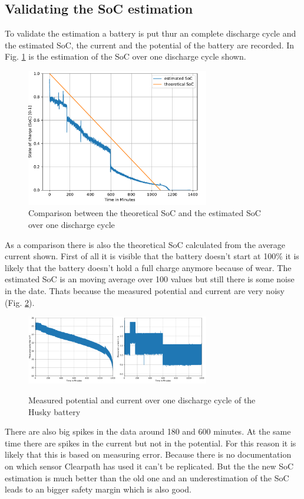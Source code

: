 \documentclass[conference]{IEEEtran}
\begin{document}
\subsection{Validating the SoC estimation}
To validate the estimation a battery is put thur an complete discharge cycle and the estimated SoC, the current and the potential of the battery are recorded.
In Fig. \ref{fig:SoCUeberZeit} is the estimation of the SoC over one discharge cycle shown.
\begin{figure}[htbp]
    \centerline{\includegraphics[width=8cm]{Pictures/SoCUeberZeit.pdf}}
    \caption{Comparison between the theoretical SoC and the estimated SoC over one discharge cycle}
    \label{fig:SoCUeberZeit}
\end{figure}
As a comparison there is also the theoretical SoC calculated from the average current shown.
First of all it is visible that the battery doesn't start at 100\% it is likely that the battery doesn't hold a full charge anymore because of wear.
The estimated SoC is an moving average over 100 values but still there is some noise in the date. Thats because the measured potential and current are very noisy (Fig. \ref{fig:SpannungStromUeberZeit}).
\begin{figure}[htbp]
    \centerline{\includegraphics[width=4cm]{Pictures/SpannungUeberZeit.pdf}\includegraphics[width=4cm]{Pictures/StormUeberZeit.pdf}}
    \caption{Measured potential and current over one discharge cycle of the Husky battery}
    \label{fig:SpannungStromUeberZeit}
\end{figure}
There are also big spikes in the data around 180 and 600 minutes. At the same time there are spikes in the current but not in the potential.
For this reason it is likely that this is based on measuring error. Because there is no documentation on which sensor Clearpath has used it can't be replicated.
But the the new SoC estimation is much better than the old one and an underestimation of the SoC leads to an bigger safety margin which is also good.
\end{document}
